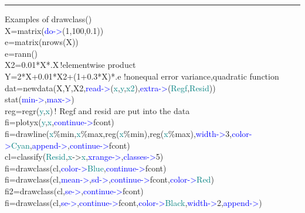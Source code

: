 \hrule 
\vspace{0.2cm} 
\singlespacing 
\begin{example}[drawclassex]Examples of \textcolor{VioletRed}{drawclass}()\\ 
\label{drawclassex} 
\noindent X=\textcolor{VioletRed}{matrix}(\textcolor{blue}{do->}(1,100,0.1))\\ 
e=\textcolor{VioletRed}{matrix}(\textcolor{VioletRed}{nrows}(X))\\ 
e=\textcolor{VioletRed}{rann}()\\ 
X2=0.01*X*.X\,{\color{ForestGreen}!elementwise product}\\ 
Y=2*X+0.01*X2+(1+0.3*X)*.e\,\,{\color{ForestGreen}!nonequal error variance,quadratic function}\\ 
dat=\textcolor{VioletRed}{newdata}(X,Y,X2,\textcolor{blue}{read->}(\textcolor{teal}{x},\textcolor{teal}{y},\textcolor{teal}{x2}),\textcolor{blue}{extra->}(\textcolor{teal}{Regf},\textcolor{teal}{Resid}))\\ 
\textcolor{VioletRed}{stat}(\textcolor{blue}{min->},\textcolor{blue}{max->})\\ 
reg=\textcolor{VioletRed}{regr}(\textcolor{teal}{y},\textcolor{teal}{x})\,{\color{ForestGreen}! Regf and resid are put into the data}\\ 
fi=\textcolor{VioletRed}{plotyx}(\textcolor{teal}{y},\textcolor{teal}{x},\textcolor{blue}{continue->}fcont)\\ 
fi=\textcolor{VioletRed}{drawline}(\textcolor{teal}{x}\%min,\textcolor{teal}{x}\%max,reg(\textcolor{teal}{x}\%min),reg(\textcolor{teal}{x}\%max),\textcolor{blue}{width->}3,\textcolor{blue}{color->}\textcolor{teal}{Cyan},\textcolor{blue}{append->},\textcolor{blue}{continue->}fcont)\\ 
cl=\textcolor{VioletRed}{classify}(\textcolor{teal}{Resid},\textcolor{teal}{x}->\textcolor{teal}{x},\textcolor{blue}{xrange->},\textcolor{blue}{classes->}5)\\ 
fi=\textcolor{VioletRed}{drawclass}(cl,\textcolor{blue}{color->}\textcolor{teal}{Blue},\textcolor{blue}{continue->}fcont)\\ 
fi=\textcolor{VioletRed}{drawclass}(cl,\textcolor{blue}{mean->},\textcolor{blue}{sd->},\textcolor{blue}{continue->}fcont,\textcolor{blue}{color->}\textcolor{teal}{Red})\\ 
fi2=\textcolor{VioletRed}{drawclass}(cl,\textcolor{blue}{se->},\textcolor{blue}{continue->}fcont)\\ 
fi=\textcolor{VioletRed}{drawclass}(cl,\textcolor{blue}{se->},\textcolor{blue}{continue->}fcont,\textcolor{blue}{color->}\textcolor{teal}{Black},\textcolor{blue}{width->}2,\textcolor{blue}{append->})\\ 

\end{example}
